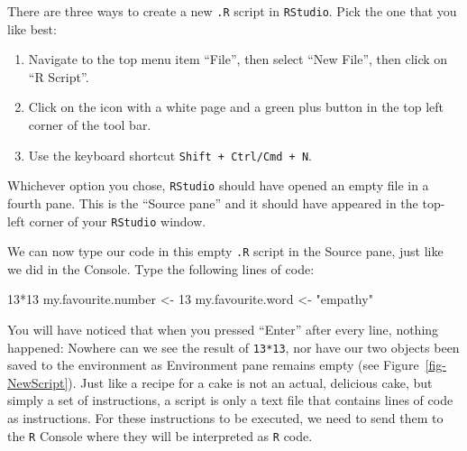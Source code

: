 \documentclass[
  letterpaper,
  DIV=11,
  numbers=noendperiod,
  oneside]{scrreprt}
\newenvironment{Shaded}{\begin{snugshade}}{\end{snugshade}}
\newcommand{\DecValTok}[1]{\textcolor[rgb]{0.68,0.00,0.00}{#1}}
\newcommand{\NormalTok}[1]{\textcolor[rgb]{0.00,0.23,0.31}{#1}}
\newcommand{\OtherTok}[1]{\textcolor[rgb]{0.00,0.23,0.31}{#1}}
\newcommand{\SpecialCharTok}[1]{\textcolor[rgb]{0.37,0.37,0.37}{#1}}
\newcommand{\StringTok}[1]{\textcolor[rgb]{0.13,0.47,0.30}{#1}}
\providecommand{\tightlist}{%
  \setlength{\itemsep}{0pt}\setlength{\parskip}{0pt}}\usepackage{longtable,booktabs,array}
\begin{document}
There are three ways to create a new \texttt{.R} script in
\texttt{RStudio}. Pick the one that you like best:

\begin{enumerate}
\def\labelenumi{\arabic{enumi}.}
\tightlist
\item
  Navigate to the top menu item ``File'', then select ``New File'', then
  click on ``R Script''.
\item
  Click on the icon with a white page and a green plus button in the top
  left corner of the tool bar.
\item
  Use the keyboard shortcut \texttt{Shift\ +\ Ctrl/Cmd\ +\ N}.
\end{enumerate}

Whichever option you chose, \texttt{RStudio} should have opened an empty
file in a fourth pane. This is the ``Source pane'' and it should have
appeared in the top-left corner of your \texttt{RStudio} window.

We can now type our code in this empty \texttt{.R} script in the Source
pane, just like we did in the Console. Type the following lines of code:

\begin{Shaded}
\begin{Highlighting}[]
\DecValTok{13}\SpecialCharTok{*}\DecValTok{13}
\NormalTok{my.favourite.number }\OtherTok{\textless{}{-}} \DecValTok{13}
\NormalTok{my.favourite.word }\OtherTok{\textless{}{-}} \StringTok{"empathy"}
\end{Highlighting}
\end{Shaded}

You will have noticed that when you pressed ``Enter'' after every line,
nothing happened: Nowhere can we see the result of \texttt{13*13}, nor
have our two objects been saved to the environment as Environment pane
remains empty (see Figure~\ref{fig-NewScript}). Just like a recipe for a
cake is not an actual, delicious cake, but simply a set of instructions,
a script is only a text file that contains lines of code as
instructions. For these instructions to be executed, we need to send
them to the \texttt{R} Console where they will be interpreted as
\texttt{R} code.
\end{document}
